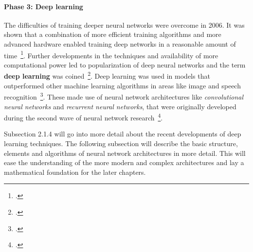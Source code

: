 
\paragraph{Phase 3: Deep learning}

The difficulties of training deeper neural networks were overcome in 2006.
It was shown that a combination of more efficient training algorithms and
more advanced hardware enabled training deep networks in a reasonable amount of 
time~\footcite{Hinton2006, Holden2006}.
Further developments in the techniques and availability of more computational
power led to popularization of deep neural networks and the term \textbf{deep
learning} was coined~\footcite{Goodfellow2016, LeCun2015}.
Deep learning was used in models that outperformed other machine learning
algorithms in areas like image and speech recognition~\footcite{Krizhevsky2012, Hinton2012}. 
These made use of neural network architectures like \textit{convolutional neural networks} 
and \textit{recurrent neural networks}, that were originally developed during 
the second wave of neural network research~\footcite{Fukushima1980, Hochreiter1997, LeCun1998}.

Subsection 2.1.4 will go into more detail about the recent developments of
deep learning techniques. The following subsection will describe the basic
structure, elements and algorithms of neural network architectures in more
detail. This will ease the understanding of the more modern and complex
architectures and lay a mathematical foundation for the later chapters.
